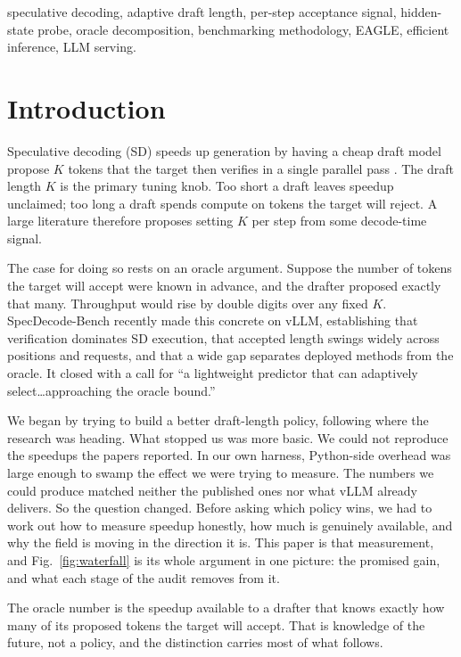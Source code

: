 \documentclass[conference]{IEEEtran}
\begin{document}
\begin{IEEEkeywords}
speculative decoding, adaptive draft length, per-step acceptance signal, hidden-state probe, oracle decomposition, benchmarking methodology, EAGLE, efficient inference, LLM serving.
\end{IEEEkeywords}

\section{Introduction}
Speculative decoding (SD) speeds up generation by having a cheap draft model propose $K$
tokens that the target then verifies in a single parallel pass \cite{leviathan2023spec,chen2023spec}.
The draft length $K$ is the primary tuning knob. Too short a draft leaves speedup unclaimed;
too long a draft spends compute on tokens the target will reject. A large literature therefore
proposes setting $K$ per step from some decode-time signal.

The case for doing so rests on an oracle argument. Suppose the number of tokens the target
will accept were known in advance, and the drafter proposed exactly that many. Throughput
would rise by double digits over any fixed $K$. SpecDecode-Bench \cite{specdecodebench} recently made this concrete
on vLLM, establishing that verification dominates SD execution, that accepted length swings
widely across positions and requests, and that a wide gap separates deployed methods from the
oracle. It closed with a call for ``a lightweight predictor that can adaptively
select\ldots approaching the oracle bound.''

We began by trying to build a better draft-length policy, following where the research was
heading. What stopped us was more basic. We could not reproduce the speedups the papers
reported. In our own harness, Python-side overhead was large enough to swamp the effect we
were trying to measure. The numbers we could produce matched neither the published ones nor
what vLLM already delivers. So the question changed. Before asking which policy wins, we
had to work out how to measure speedup honestly, how much is genuinely available, and why the
field is moving in the direction it is. This paper is that measurement, and
Fig.~\ref{fig:waterfall} is its whole argument in one picture: the promised gain, and what
each stage of the audit removes from it.

The oracle number is the speedup available to a drafter that knows exactly how many of its
proposed tokens the target will accept. That is knowledge of the future, not a policy, and the
distinction carries most of what follows.
\end{document}

